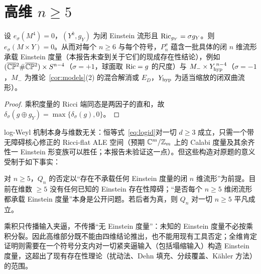 \section{高维 $n\ge5$}\label{sec:highdim}

\begin{proposition}\label{prop:product}
设 $e_\sigma(M^4)=0$，$(Y^k,g_Y)$ 为闭 Einstein 流形且 $\operatorname{Ric}_{g_Y}=\sigma g_Y$。则 $e_\sigma(M\times Y)=0$。从而对每个 $n\ge6$ 与每个符号，$P_n^\sigma$ 蕴含一批具体的闭 $n$ 维流形承载 Einstein 度量（本报告未查到关于它们的现成存在性结论），例如 $(\overline{\mathbb{CP}}{}^2\#\overline{\mathbb{CP}}{}^2)\times S^{n-4}$（$\sigma=+1$，球面取 $\operatorname{Ric}=g$ 的尺度）与 $M_-\times Y_{\rm hyp}^{\,n-4}$（$\sigma=-1$，$M_-$ 为推论~\ref{cor:models}(2) 的混合解消或 $E_D$，$Y_{\rm hyp}$ 为适当缩放的闭双曲流形）。
\end{proposition}
\begin{proof}
乘积度量的 Ricci 端同态是两因子的直和，故 $\delta_\sigma(g\oplus g_Y)=\max\{\delta_\sigma(g),0\}$。
\end{proof}

log-Weyl 机制本身与维数无关：恒等式~\eqref{eq:logid}对一切 $d\ge3$ 成立，只需一个带无障碍核心修正的 Ricci-flat ALE 空间（预期 $\mathbb C^m/\mathbb Z_m$ 上的 Calabi 度量及其余齐性一 Einstein 形变族可以胜任；本报告未验证这一点）。但这些构造对原题的意义受制于如下事实：

\begin{proposition}
对 $n\ge5$，$Q_n$ 的否定以“存在不承载任何 Einstein 度量的闭 $n$ 维流形”为前提。目前在维数 $\ge5$ 没有任何已知的 Einstein 存在性障碍；“是否每个 $n\ge5$ 维闭流形都承载 Einstein 度量”本身是公开问题。若后者为真，则 $Q_n$ 对一切 $n\ge5$ 平凡成立。
\end{proposition}
乘积只传播输入夹逼，不传播“无 Einstein 度量”：未知的 Einstein 度量不必按乘积分裂。因此高维部分既不能由四维结论推出，也不能用现有工具否定；全维肯定证明则需要在一个符号分支内对一切紧夹逼输入（包括塌缩输入）构造 Einstein 度量，这超出了现有存在性理论（扰动法、Dehn 填充、分歧覆盖、Kähler 方法）的范围。
